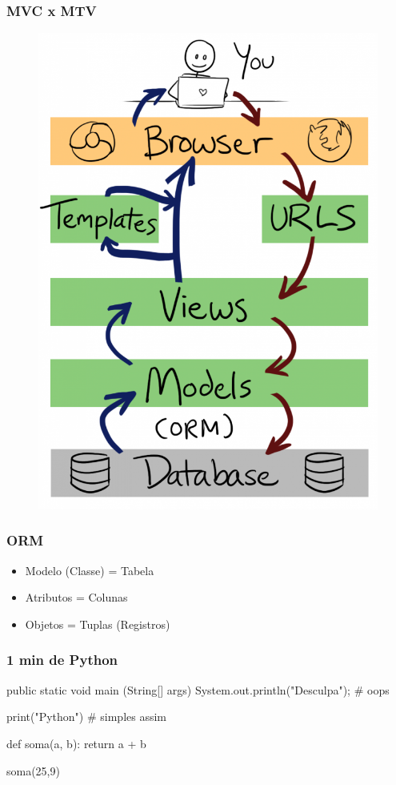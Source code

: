\documentclass[aspectratio=169]{beamer}
\begin{document}
\begin{frame}\frametitle{MVC x MTV}
	\begin{figure}[h]
	  \centering
  		\includegraphics[height=.9\paperheight]{img/mtv2.png}
	\end{figure}
\end{frame}


\begin{frame}\frametitle{ORM}

\begin{itemize}
	\item Modelo (Classe) = Tabela
	\item Atributos = Colunas
	\item Objetos = Tuplas (Registros)
\end{itemize}

\end{frame}

\begin{frame}[fragile]\frametitle{1 min de Python}

\begin{pythoncode}
    public static void main (String[] args){
        System.out.println("Desculpa");
    } # oops

    print("Python") # simples assim

    def soma(a, b):
        return a + b

    soma(25,9)
\end{pythoncode}

\end{frame}
\end{document}
